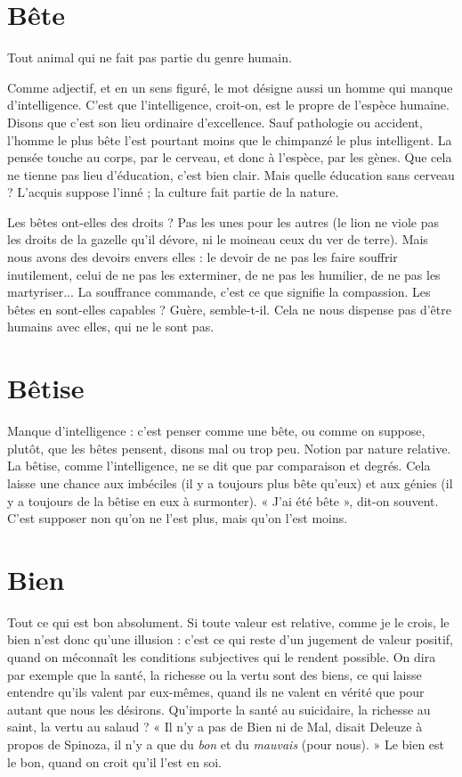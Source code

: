 \section{Bête}
Tout animal qui ne fait pas partie du genre humain.

Comme adjectif, et en un sens figuré, le mot désigne aussi un homme
qui manque d'intelligence. C’est que l'intelligence, croit-on, est le propre de
l'espèce humaine. Disons que c’est son lieu ordinaire d’excellence. Sauf pathologie
ou accident, l’homme le plus bête l’est pourtant moins que le chimpanzé
le plus intelligent. La pensée touche au corps, par le cerveau, et donc à l’espèce,
par les gènes. Que cela ne tienne pas lieu d'éducation, c’est bien clair. Mais
quelle éducation sans cerveau ? L’acquis suppose l’inné ; la culture fait partie de
la nature.

Les bêtes ont-elles des droits ? Pas les unes pour les autres (le lion ne viole
pas les droits de la gazelle qu’il dévore, ni le moineau ceux du ver de terre).
Mais nous avons des devoirs envers elles : le devoir de ne pas les faire souffrir
inutilement, celui de ne pas les exterminer, de ne pas les humilier, de ne pas les
martyriser... La souffrance commande, c’est ce que signifie la compassion. Les
bêtes en sont-elles capables ? Guère, semble-t-il. Cela ne nous dispense pas
d’être humains avec elles, qui ne le sont pas.

\section{Bêtise}
Manque d’intelligence : c’est penser comme une bête, ou comme on
suppose, plutôt, que les bêtes pensent, disons mal ou trop peu.
Notion par nature relative. La bêtise, comme l'intelligence, ne se dit que par
comparaison et degrés. Cela laisse une chance aux imbéciles (il y a toujours plus
bête qu’eux) et aux génies (il y a toujours de la bêtise en eux à surmonter). « J'ai
été bête », dit-on souvent. C’est supposer non qu’on ne l’est plus, mais qu’on
l'est moins.

\section{Bien}
Tout ce qui est bon absolument. Si toute valeur est relative, comme je
le crois, le bien n’est donc qu’une illusion : c’est ce qui reste d’un jugement
de valeur positif, quand on méconnaît les conditions subjectives qui le
rendent possible. On dira par exemple que la santé, la richesse ou la vertu sont
des biens, ce qui laisse entendre qu’ils valent par eux-mêmes, quand ils ne
valent en vérité que pour autant que nous les désirons. Qu'importe la santé au
suicidaire, la richesse au saint, la vertu au salaud ? « Il n’y a pas de Bien ni de
Mal, disait Deleuze à propos de Spinoza, il n’y a que du {\it bon} et du {\it mauvais}
(pour nous). » Le bien est le bon, quand on croit qu’il l’est en soi.

